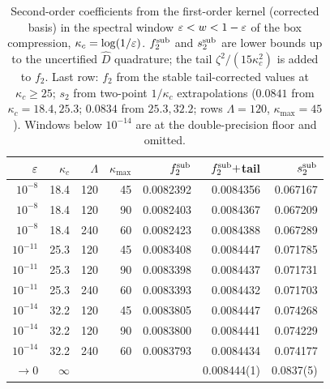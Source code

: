 \begin{table}[ht]\centering\small
\caption{Second-order coefficients from the first-order kernel (corrected basis) in the spectral window \(\varepsilon<w<1-\varepsilon\) of the box compression, \(\kappa_c=\log(1/\varepsilon)\). \(f_2^{\rm sub}\) and \(s_2^{\rm sub}\) are lower bounds up to the uncertified \(\widehat D\) quadrature; the tail \(\zeta^2/(15\kappa_c^2)\) is added to \(f_2\). Last row: \(f_2\) from the stable tail-corrected values at \(\kappa_c\ge25\); \(s_2\) from two-point \(1/\kappa_c\) extrapolations (\(0.0841\) from \(\kappa_c=18.4,25.3\); \(0.0834\) from \(25.3,32.2\); rows \(\Lambda=120\), \(\kappa_{\max}=45\)). Windows below \(10^{-14}\) are at the double-precision floor and omitted.}\label{tab:second-order}
\begin{tabular}{r r r r r r r}\toprule
\(\varepsilon\) & \(\kappa_c\) & \(\Lambda\) & \(\kappa_{\max}\) & \(f_2^{\rm sub}\) & \(f_2^{\rm sub}+\)tail & \(s_2^{\rm sub}\) \\\midrule
\(10^{-8}\) & 18.4 & 120 & 45 & 0.0082392 & 0.0084356 & 0.067167 \\
\(10^{-8}\) & 18.4 & 120 & 90 & 0.0082403 & 0.0084367 & 0.067209 \\
\(10^{-8}\) & 18.4 & 240 & 60 & 0.0082423 & 0.0084388 & 0.067289 \\
\(10^{-11}\) & 25.3 & 120 & 45 & 0.0083408 & 0.0084447 & 0.071785 \\
\(10^{-11}\) & 25.3 & 120 & 90 & 0.0083398 & 0.0084437 & 0.071731 \\
\(10^{-11}\) & 25.3 & 240 & 60 & 0.0083393 & 0.0084432 & 0.071703 \\
\(10^{-14}\) & 32.2 & 120 & 45 & 0.0083805 & 0.0084447 & 0.074268 \\
\(10^{-14}\) & 32.2 & 120 & 90 & 0.0083800 & 0.0084441 & 0.074229 \\
\(10^{-14}\) & 32.2 & 240 & 60 & 0.0083793 & 0.0084434 & 0.074177 \\
\(\to0\) & \(\infty\) & & & & 0.008444(1) & 0.0837(5) \\
\bottomrule\end{tabular}\end{table}
